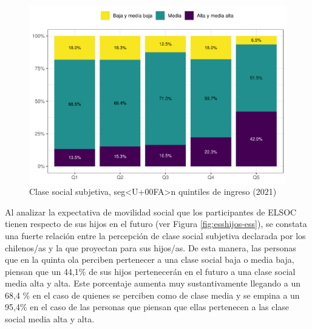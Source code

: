 \documentclass[
  12pt,
]{book}
\begin{document}
\begin{figure}

{\centering \includegraphics{reporte-elsoc_files/figure-latex/ess-quintil-1} 

}

\caption{Clase social subjetiva, seg<U+00FA>n quintiles de ingreso (2021)}\label{fig:ess-quintil}
\end{figure}

Al analizar la expectativa de movilidad social que los participantes de ELSOC tienen respecto de sus hijos en el futuro (ver Figura \ref{fig:esshijos-ess}), se constata una fuerte relación entre la percepción de clase social subjetiva declarada por los chilenos/as y la que proyectan para sus hijos/as. De esta manera, las personas que en la quinta ola perciben pertenecer a una clase social baja o media baja, piensan que un 44,1\% de sus hijos pertenecerán en el futuro a una clase social media alta y alta. Este porcentaje aumenta muy sustantivamente llegando a un 68,4 \% en el caso de quienes se perciben como de clase media y se empina a un 95,4\% en el caso de las personas que piensan que ellas pertenecen a las clase social media alta y alta.
\end{document}
